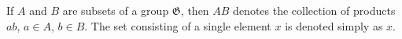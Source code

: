If $A$ and $B$ are subsets of a group $\mathfrak{G}$, then $AB$ denotes the collection of products $ab$, $a \in A$, $b \in B$. The set consisting of a single element $x$ is denoted simply as $x$.
